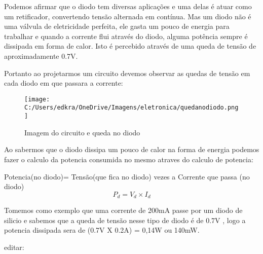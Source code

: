 \documentclass[a4paper,12pt]{article}
\begin{document}
Podemos afirmar que o diodo tem diversas aplicações e uma delas é atuar como um retificador, convertendo tensão alternada em contínua. Mas um diodo não é uma válvula de eletricidade perfeita, ele gasta um pouco de energia para trabalhar e quando a corrente flui através do diodo, alguma potência sempre é dissipada em forma de calor. Isto é percebido através de uma queda de tensão de aproximadamente 0.7V.

Portanto ao projetarmos um circuito devemos observar as quedas de tensão em cada diodo em que passara a corrente:

\vspace{.07cm}
\begin{figure}[h]
\centering
	\texttt{[image: C:/Users/edkra/OneDrive/Imagens/eletronica/quedanodiodo.png]}
	\label{QuedanoDiodo}
	\caption{Imagem do circuito e queda no  diodo}	
\end{figure}
\newpage
Ao sabermos que o diodo dissipa um pouco de calor na forma de energia podemos fazer o calculo da potencia consumida no mesmo atraves do calculo de potencia: 

Potencia(no diodo)= Tensão(que fica no diodo) vezes a Corrente que passa (no diodo)
\begin{equation}
		P_d = V_d \times I_d
\end{equation}

Tomemos como exemplo que uma corrente de 200mA passe por um diodo de silicio e sabemos que a queda de tensão nesse tipo de diodo é de 0.7V , logo a potencia dissipada sera de (0.7V X 0.2A) = 0,14W ou 140mW.

editar:
\end{document}
